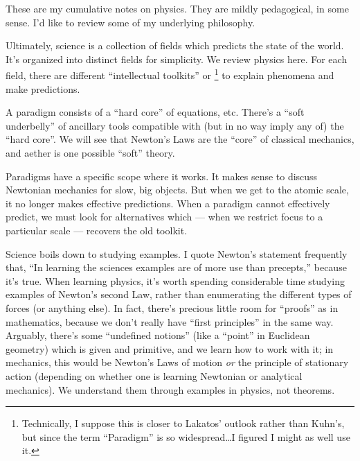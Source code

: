 
\M
These are my cumulative notes on physics. They are mildly pedagogical,
in some sense. I'd like to review some of my underlying philosophy.

Ultimately, science is a collection of fields which predicts the state
of the world. It's organized into distinct fields for simplicity. We
review physics here. For each field, there are different ``intellectual
toolkits'' or \footnote{Technically, I suppose this is
closer to Lakatos' outlook rather than Kuhn's, but since the term
``Paradigm'' is so widespread\dots I figured I might as well use it.}
to explain phenomena and make predictions.

\M A paradigm consists of a ``hard core'' of equations, etc. There's a
``soft underbelly'' of ancillary tools compatible with (but in no way
imply any of) the ``hard core''. We will see that Newton's Laws are the
``core'' of classical mechanics, and aether is one possible ``soft''
theory.

Paradigms have a specific scope where it works. It makes sense to
discuss Newtonian mechanics for slow, big objects. But when we get to
the atomic scale, it no longer makes effective predictions. When a
paradigm cannot effectively predict, we must look for alternatives which
--- when we restrict focus to a particular scale --- recovers the old
toolkit.

 Science boils down to studying examples. I quote Newton's
statement frequently that, ``In learning the sciences examples are of
more use than precepts,'' because it's true. When learning physics, it's
worth spending considerable time studying examples of Newton's second
Law, rather than enumerating the different types of forces (or anything
else). In fact, there's precious little room for ``proofs'' as in
mathematics, because we don't really have ``first principles'' in the
same way. Arguably, there's some ``undefined notions'' (like a ``point''
in Euclidean geometry) which is given and primitive, and we learn how to
work with it; in mechanics, this would be Newton's Laws of
motion \emph{or} the principle of stationary action (depending on
whether one is learning Newtonian or analytical mechanics). We
understand them through examples in physics, not theorems.

